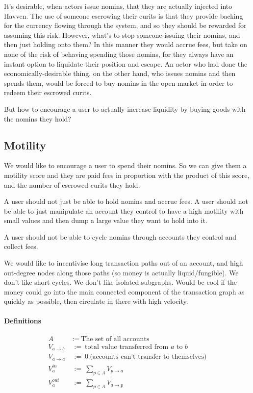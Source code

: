 \documentclass{article}
\begin{document}
It's desirable, when actors issue nomins, that they are actually injected into Havven.
The use of someone escrowing their curits is that they provide backing for the currency flowing through the system,
and so they should be rewarded for assuming this risk.
However, what's to stop someone issuing their nomins, and then just holding onto them? In this manner they
would accrue fees, but take on none of the risk of behaving spending those nomins, for they always have an instant
option to liquidate their position and escape. An actor who had done the economically-desirable thing, on
the other hand, who issues nomins and then spends them, would be forced to buy nomins in the open market in
order to redeem their escrowed curits.

But how to encourage a user to actually increase liquidity by buying goods with the nomins they hold? 


\subsection{Motility}

We would like to encourage a user to spend their nomins. So we can give them a motility score 
and they are paid fees in proportion with the product of this score, and the number of escrowed curits
they hold.

A user should not just be able to hold nomins and accrue fees. A user should not be able to just manipulate 
an account they control to have a high motility with small values and then dump a large value they want to hold
into it.

A user should not be able to cycle nomins through accounts they control and collect fees.

We would like to incentivise long transaction paths out of an account, and high out-degree nodes along those paths
(so money is actually liquid/fungible).
We don't like short cycles. We don't like isolated subgraphs. Would be cool if the money could go into the main
connected component of the transaction graph as quickly as possible, then circulate in there with high velocity.


\paragraph{Definitions}
\begin{align*}
    A \ &:= \ \text{The set of all accounts} \\
    V_{a \rightarrow b} \ &:= \ \text{total value transferred from \(a\) to \(b\)} \\
    V_{a \rightarrow a} \ &:= \ 0 \ \text{(accounts can't transfer to themselves)} \\
    V_{a}^{in} \ &:= \ \sum_{p \in A}{V_{p \rightarrow a}} \\
    V_{a}^{out} \ &:= \ \sum_{p \in A}{V_{a \rightarrow p}}
\end{align*}
\end{document}
